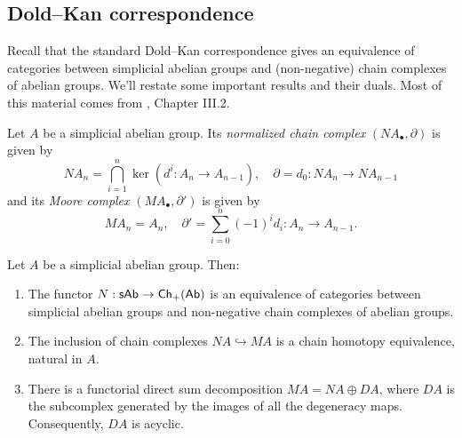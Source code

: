 \subsection{Dold--Kan correspondence} Recall that the standard Dold--Kan correspondence gives an equivalence of categories between simplicial abelian groups and (non-negative) chain complexes of abelian groups. We'll restate some important results and their duals. Most of this material comes from \cite{Goerss2009}, Chapter III.2.

\begin{defn}
  Let $A$ be a simplicial abelian group. Its \emph{normalized chain complex} $(NA_\bullet, \partial)$ is given by
  \[NA_n = \bigcap_{i=1}^{n} \ker(d^i: A_n \to A_{n-1}),\quad \partial = d_0: NA_n \to NA_{n-1}\]
  and its \emph{Moore complex} $(MA_\bullet, \partial')$ is given by 
  \[MA_n = A_n, \quad \partial' = \sum_{i=0}^n (-1)^i d_i: A_n\to A_{n-1}.\]
\end{defn}

\begin{thm} Let $A$ be a simplicial abelian group. Then:
  \begin{enumerate}
  \item The functor $N: \mathsf{sAb} \to \mathsf{Ch_+(Ab)}$ is an equivalence of categories between simplicial abelian groups and non-negative chain complexes of abelian groups.
  \item The inclusion of chain complexes $NA\hookrightarrow MA$ is a chain homotopy equivalence, natural in $A$.
  \item There is a functorial direct sum decomposition $MA = NA \oplus DA$, where $DA$ is the subcomplex generated by the images of all the degeneracy maps. Consequently, $DA$ is acyclic.
  \end{enumerate}
\end{thm}


